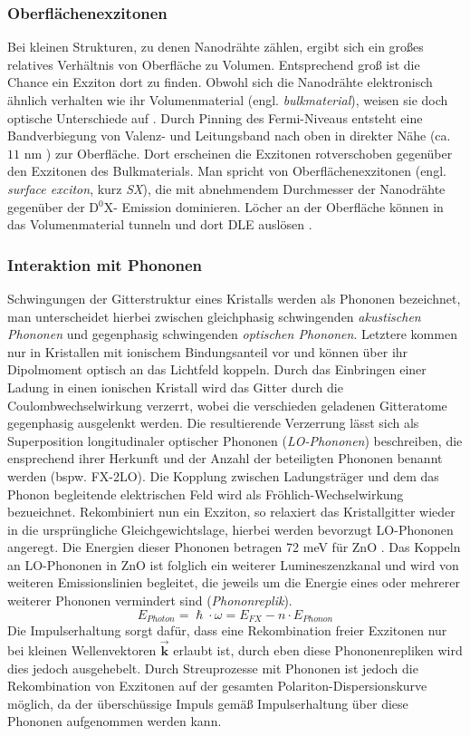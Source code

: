 \subsubsection{Oberflächenexzitonen}
Bei kleinen Strukturen, zu denen Nanodrähte zählen, ergibt sich ein großes relatives Verhältnis von Oberfläche zu Volumen. Entsprechend groß ist die Chance ein Exziton dort zu finden. Obwohl sich die Nanodrähte elektronisch ähnlich verhalten wie ihr Volumenmaterial (engl. \textit{bulkmaterial}), weisen sie doch optische Unterschiede auf \cite{Voss.2010}. Durch Pinning des Fermi-Niveaus entsteht eine Bandverbiegung von Valenz- und Leitungsband nach oben in direkter Nähe (ca. $11$ nm \cite{Richters.Diss}) zur Oberfläche. Dort erscheinen die Exzitonen rotverschoben gegenüber den Exzitonen des Bulkmaterials. Man spricht von Oberflächenexzitonen (engl. \textit{surface exciton}, kurz \textit{SX}), die mit abnehmendem Durchmesser der Nanodrähte gegenüber der D$^\text{0}$X- Emission dominieren. Löcher an der Oberfläche können in das Volumenmaterial tunneln und dort DLE auslösen \cite{Voss.2010}.
\subsubsection{Interaktion mit Phononen}
Schwingungen der Gitterstruktur eines Kristalls werden als Phononen bezeichnet, man unterscheidet hierbei zwischen gleichphasig schwingenden \textit{akustischen Phononen} und gegenphasig schwingenden \textit{optischen Phononen}. Letztere kommen nur in Kristallen mit ionischem Bindungsanteil vor und können über ihr Dipolmoment optisch an das Lichtfeld koppeln. Durch das Einbringen  einer Ladung in einen ionischen Kristall wird das Gitter durch die Coulombwechselwirkung verzerrt, wobei die verschieden geladenen Gitteratome gegenphasig ausgelenkt werden. Die resultierende Verzerrung lässt sich als Superposition longitudinaler optischer Phononen (\textit{LO-Phononen}) beschreiben, die ensprechend ihrer Herkunft und der Anzahl der beteiligten Phononen benannt werden (bspw. FX-2LO). Die Kopplung zwischen Ladungsträger und dem das Phonon begleitende elektrischen Feld wird als Fröhlich-Wechselwirkung bezueichnet. Rekombiniert nun ein Exziton, so relaxiert das Kristallgitter wieder in die ursprüngliche Gleichgewichtslage, hierbei werden bevorzugt LO-Phononen angeregt. Die Energien dieser Phononen betragen 72 meV für ZnO \cite{Damen.1966}. Das Koppeln an LO-Phononen in ZnO ist folglich ein weiterer Lumineszenzkanal und wird von weiteren Emissionslinien begleitet, die jeweils um die Energie eines oder mehrerer weiterer Phononen vermindert sind (\textit{Phononreplik}).
\begin{equation}
E_{Photon}=\hslash \cdot \omega=E_{FX}-n\cdot E_{Phonon}
\end{equation}
Die Impulserhaltung sorgt dafür, dass eine Rekombination freier Exzitonen nur bei kleinen Wellenvektoren $\vec{\textbf{k}}$ erlaubt ist, durch eben diese Phononenrepliken wird dies jedoch ausgehebelt. Durch Streuprozesse mit Phononen ist jedoch die Rekombination von Exzitonen auf der gesamten Polariton-Dispersionskurve möglich, da der überschüssige Impuls gemäß Impulserhaltung über diese Phononen aufgenommen werden kann. \cite{Wischmeier.Diss}
